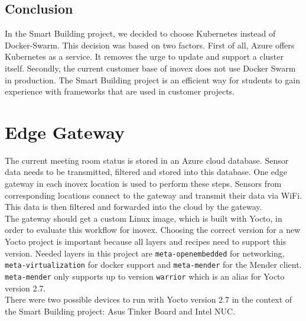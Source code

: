 \subsection{Conclusion}
In the Smart Building project, we decided to choose Kubernetes instead of Docker-Swarm. This decision was based on two factors. First of all, Azure offers Kubernetes as a service. It removes the urge to update and support a cluster itself. Secondly, the current customer base of inovex does not use Docker Swarm in production. The Smart Building project is an efficient way for students to gain experience with frameworks that are used in customer projects.

\section{Edge Gateway}
The current meeting room status is stored in an Azure cloud database. Sensor data needs to be transmitted, filtered and stored into this database. One edge gateway in each inovex location is used to perform these steps. Sensors from corresponding locations connect to the gateway and transmit their data via WiFi. This data is then filtered and forwarded into the cloud by the gateway.\\
The gateway should get a custom Linux image, which is built with Yocto, in order to evaluate this workflow for inovex. Choosing the correct version for a new Yocto project is important because all layers and recipes need to support this version. Needed layers in this project are \verb|meta-openembedded| for networking, \verb|meta-virtualization| for docker support and \verb|meta-mender| for the Mender client. \verb|meta-mender| only supports up to version \verb|warrior| which is an alias for Yocto version 2.7.\\
There were two possible devices to run with Yocto version 2.7 in the context of the Smart Building project: Asus Tinker Board and Intel NUC.

